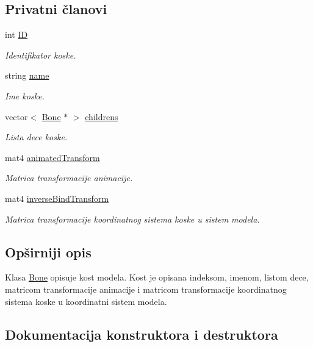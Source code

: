 \subsection*{Privatni članovi}
\begin{DoxyCompactItemize}
\item 
int \hyperlink{classmodel_1_1Bone_a7a300f62a3d7ffdde6f31d55cdffa44e}{ID}
\begin{DoxyCompactList}\small\item\em Identifikator koske. \end{DoxyCompactList}\item 
string \hyperlink{classmodel_1_1Bone_ad1613b072247f5310db1ad9ec9182956}{name}
\begin{DoxyCompactList}\small\item\em Ime koske. \end{DoxyCompactList}\item 
vector$<$ \hyperlink{classmodel_1_1Bone}{Bone} $\ast$ $>$ \hyperlink{classmodel_1_1Bone_a41f8eef1aa80ccb7bb47f6de93316cf7}{childrens}
\begin{DoxyCompactList}\small\item\em Lista dece koske. \end{DoxyCompactList}\item 
mat4 \hyperlink{classmodel_1_1Bone_a72f5c45330effbe7a68b7984fcf2250e}{animated\+Transform}
\begin{DoxyCompactList}\small\item\em Matrica transformacije animacije. \end{DoxyCompactList}\item 
mat4 \hyperlink{classmodel_1_1Bone_a4e3fe672d5a018cf9755a344c9f193ab}{inverse\+Bind\+Transform}
\begin{DoxyCompactList}\small\item\em Matrica transformacije koordinatnog sistema koske u sistem modela. \end{DoxyCompactList}\end{DoxyCompactItemize}


\subsection{Opširniji opis}
Klasa \hyperlink{classmodel_1_1Bone}{Bone} opisuje kost modela. Kost je opisana indeksom, imenom, listom dece, matricom transformacije animacije i matricom transformacije koordinatnog sistema koske u koordinatni sistem modela. 

\subsection{Dokumentacija konstruktora i destruktora}
\mbox{\label{classmodel_1_1Bone_ac2ed136fad04b08ececc34627053d1f0}} 
